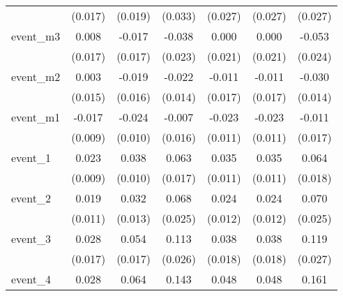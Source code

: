 {\begin{tabular}{l*{6}{c}}
            &     (0.017)         &     (0.019)         &     (0.033)         &     (0.027)         &     (0.027)         &     (0.027)         \\
[1em]
event\_m3    &       0.008         &      -0.017         &      -0.038         &       0.000         &       0.000         &      -0.053\sym{*}  \\
            &     (0.017)         &     (0.017)         &     (0.023)         &     (0.021)         &     (0.021)         &     (0.024)         \\
[1em]
event\_m2    &       0.003         &      -0.019         &      -0.022         &      -0.011         &      -0.011         &      -0.030\sym{*}  \\
            &     (0.015)         &     (0.016)         &     (0.014)         &     (0.017)         &     (0.017)         &     (0.014)         \\
[1em]
event\_m1    &      -0.017         &      -0.024\sym{*}  &      -0.007         &      -0.023\sym{*}  &      -0.023\sym{*}  &      -0.011         \\
            &     (0.009)         &     (0.010)         &     (0.016)         &     (0.011)         &     (0.011)         &     (0.017)         \\
[1em]
event\_1     &       0.023\sym{**} &       0.038\sym{***}&       0.063\sym{***}&       0.035\sym{**} &       0.035\sym{**} &       0.064\sym{***}\\
            &     (0.009)         &     (0.010)         &     (0.017)         &     (0.011)         &     (0.011)         &     (0.018)         \\
[1em]
event\_2     &       0.019         &       0.032\sym{*}  &       0.068\sym{**} &       0.024\sym{*}  &       0.024\sym{*}  &       0.070\sym{**} \\
            &     (0.011)         &     (0.013)         &     (0.025)         &     (0.012)         &     (0.012)         &     (0.025)         \\
[1em]
event\_3     &       0.028         &       0.054\sym{**} &       0.113\sym{***}&       0.038\sym{*}  &       0.038\sym{*}  &       0.119\sym{***}\\
            &     (0.017)         &     (0.017)         &     (0.026)         &     (0.018)         &     (0.018)         &     (0.027)         \\
[1em]
event\_4     &       0.028         &       0.064\sym{***}&       0.143\sym{***}&       0.048\sym{***}&       0.048\sym{***}&       0.161\sym{***}\\

\end{tabular}}
